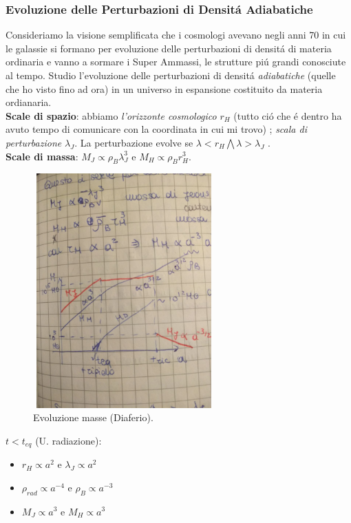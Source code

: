 \documentclass[12pt, a4paper]{article}
\begin{document}
\subsubsection{Evoluzione delle Perturbazioni di Densit\'{a} Adiabatiche}
Consideriamo la visione semplificata che i cosmologi avevano negli anni 70 in cui le galassie si formano per evoluzione delle perturbazioni di densit\'{a} di materia ordinaria e vanno a sormare i Super Ammassi, le strutture pi\'{u} grandi conosciute al tempo. Studio l'evoluzione delle perturbazioni di densit\'{a} \textit{adiabatiche} (quelle che ho visto fino ad ora) in un universo in espansione costituito da materia ordianaria.\\
\textbf{Scale di spazio}: abbiamo \textit{l'orizzonte cosmologico} $r_H$ (tutto ci\'{o} che \'{e} dentro ha avuto tempo di comunicare con la coordinata in cui mi trovo) ; \textit{scala di perturbazione} $\lambda_J$. La perturbazione evolve se $\lambda<r_H \bigwedge \lambda>\lambda_J$ .\\
\textbf{Scale di massa}: $M_J\propto \rho_B \lambda_J^3$ e $M_H\propto \rho_B r_H^3$. \\
\begin{figure}[htp]
    \centering
    \includegraphics[width=7cm, height=9cm]{images/massev.jpeg}
    \caption{Evoluzione masse (Diaferio).}
    \label{fig:massev1}
\end{figure}
\underline{$t<t_{eq}$} (U. radiazione): \\
\begin{itemize}
\item $r_H\propto a^2 $ e $ \lambda_J\propto a^2$
\item $\rho_{rad}\propto a^{-4}$ e $\rho_B\propto a^{-3}$
\item $M_J\propto a^{3}$ e $M_H\propto a^{3}$
\end{itemize}
\end{document}
